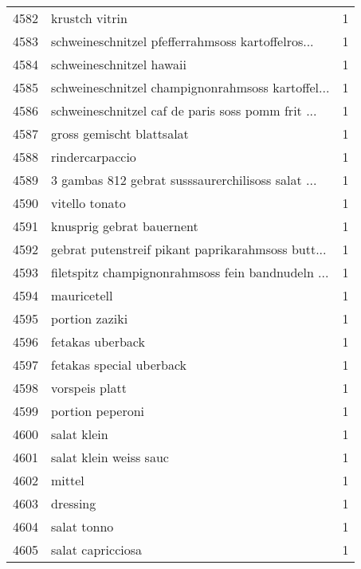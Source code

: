 \begin{tabular}{llr}
4582 &                                     krustch vitrin &      1 \\
4583 &  schweineschnitzel pfefferrahmsoss kartoffelros... &      1 \\
4584 &                           schweineschnitzel hawaii &      1 \\
4585 &  schweineschnitzel champignonrahmsoss kartoffel... &      1 \\
4586 &  schweineschnitzel caf de paris soss pomm frit ... &      1 \\
4587 &                          gross gemischt blattsalat &      1 \\
4588 &                                    rindercarpaccio &      1 \\
4589 &  3 gambas 812 gebrat susssaurerchilisoss salat ... &      1 \\
4590 &                                     vitello tonato &      1 \\
4591 &                          knusprig gebrat bauernent &      1 \\
4592 &  gebrat putenstreif pikant paprikarahmsoss butt... &      1 \\
4593 &  filetspitz champignonrahmsoss fein bandnudeln ... &      1 \\
4594 &                                        mauricetell &      1 \\
4595 &                                     portion zaziki &      1 \\
4596 &                                   fetakas uberback &      1 \\
4597 &                           fetakas special uberback &      1 \\
4598 &                                     vorspeis platt &      1 \\
4599 &                                   portion peperoni &      1 \\
4600 &                                        salat klein &      1 \\
4601 &                             salat klein weiss sauc &      1 \\
4602 &                                             mittel &      1 \\
4603 &                                           dressing &      1 \\
4604 &                                        salat tonno &      1 \\
4605 &                                  salat capricciosa &      1 \\

\end{tabular}
